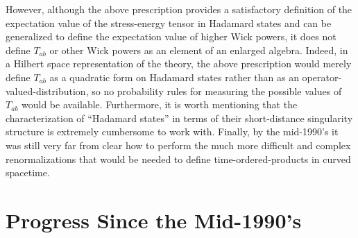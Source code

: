 However, although the above prescription provides a satisfactory
definition of the expectation value of the stress-energy tensor in
Hadamard states and can be generalized to define the expectation value
of higher Wick powers, it does not define $T_{ab}$ or other Wick
powers as an element of an enlarged algebra. Indeed, in a Hilbert
space representation of the theory, the above prescription would
merely define $T_{ab}$ as a quadratic form on Hadamard states rather
than as an operator-valued-distribution, so no probability rules for
measuring the possible values of $T_{ab}$ would be
available. Furthermore, it is worth mentioning that the
characterization of ``Hadamard states'' in terms of their
short-distance singularity structure is extremely cumbersome to work
with. Finally, by the mid-1990's it was still very far from clear how
to perform the much more difficult and complex renormalizations that
would be needed to define time-ordered-products in curved spacetime.


\section{Progress Since the Mid-1990's}

